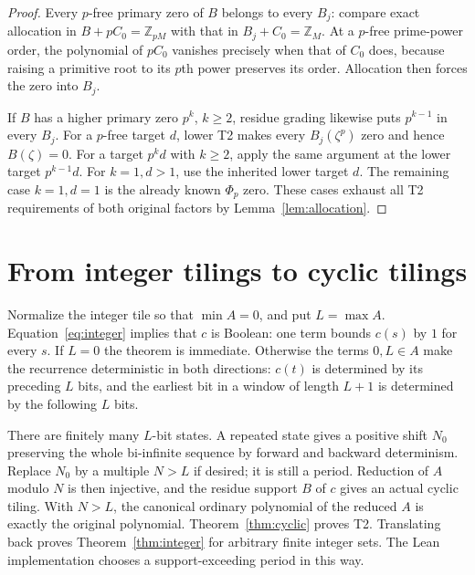 \documentclass[11pt]{article}
\newcommand{\Z}{\mathbb Z}
\newcommand{\PhiC}{\Phi}
\begin{document}
\begin{proof}
Every $p$-free primary zero of $B$ belongs to every $B_j$: compare exact allocation in $B+pC_0=\Z_{pM}$ with that in $B_j+C_0=\Z_M$. At a $p$-free prime-power order, the polynomial of $pC_0$ vanishes precisely when that of $C_0$ does, because raising a primitive root to its $p$th power preserves its order. Allocation then forces the zero into $B_j$.

If $B$ has a higher primary zero $p^k$, $k\ge2$, residue grading likewise puts $p^{k-1}$ in every $B_j$. For a $p$-free target $d$, lower T2 makes every $B_j(\zeta^p)$ zero and hence $B(\zeta)=0$. For a target $p^kd$ with $k\ge2$, apply the same argument at the lower target $p^{k-1}d$. For $k=1,d>1$, use the inherited lower target $d$. The remaining case $k=1,d=1$ is the already known $\PhiC_p$ zero. These cases exhaust all T2 requirements of both original factors by Lemma~\ref{lem:allocation}.
\end{proof}

\section{From integer tilings to cyclic tilings}
Normalize the integer tile so that $\min A=0$, and put $L=\max A$. Equation~\eqref{eq:integer} implies that $c$ is Boolean: one term bounds $c(s)$ by $1$ for every $s$. If $L=0$ the theorem is immediate. Otherwise the terms $0,L\in A$ make the recurrence deterministic in both directions: $c(t)$ is determined by its preceding $L$ bits, and the earliest bit in a window of length $L+1$ is determined by the following $L$ bits.

There are finitely many $L$-bit states. A repeated state gives a positive shift $N_0$ preserving the whole bi-infinite sequence by forward and backward determinism. Replace $N_0$ by a multiple $N>L$ if desired; it is still a period. Reduction of $A$ modulo $N$ is then injective, and the residue support $B$ of $c$ gives an actual cyclic tiling. With $N>L$, the canonical ordinary polynomial of the reduced $A$ is exactly the original polynomial. Theorem~\ref{thm:cyclic} proves T2. Translating back proves Theorem~\ref{thm:integer} for arbitrary finite integer sets. The Lean implementation chooses a support-exceeding period in this way.

\appendix
\end{document}
